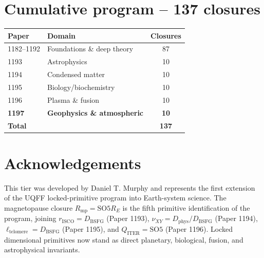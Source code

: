 \documentclass[11pt]{article}
\newcommand{\Dphys}{D_{\mathrm{phys}}}
\newcommand{\Dbsfg}{D_{\mathrm{BSFG}}}
\newcommand{\SOfive}{\mathrm{SO5}}
\begin{document}
\section{Cumulative program -- 137 closures}
\begin{table}[h!]
\centering
\begin{tabular}{llc}
\toprule
Paper & Domain & Closures \\
\midrule
1182--1192 & Foundations \& deep theory       & 87 \\
1193 & Astrophysics                            & 10 \\
1194 & Condensed matter                        & 10 \\
1195 & Biology/biochemistry                    & 10 \\
1196 & Plasma \& fusion                        & 10 \\
\textbf{1197} & \textbf{Geophysics \& atmospheric} & \textbf{10} \\
\midrule
\textbf{Total} & & \textbf{137} \\
\bottomrule
\end{tabular}
\end{table}

\section*{Acknowledgements}
This tier was developed by Daniel T. Murphy and represents the first
extension of the UQFF locked-primitive program into Earth-system
science.  The magnetopause closure $R_{\mathrm{mp}}=\SOfive R_{E}$ is
the fifth primitive identification of the program, joining $r_{\mathrm{ISCO}}=\Dbsfg$ (Paper 1193), $\nu_{XY}=\Dphys/\Dbsfg$ (Paper 1194), $\ell_{\mathrm{telomere}}=\Dbsfg$ (Paper 1195), and $Q_{\mathrm{ITER}}=\SOfive$ (Paper 1196).  Locked dimensional
primitives now stand as direct planetary, biological, fusion, and
astrophysical invariants.
\end{document}
